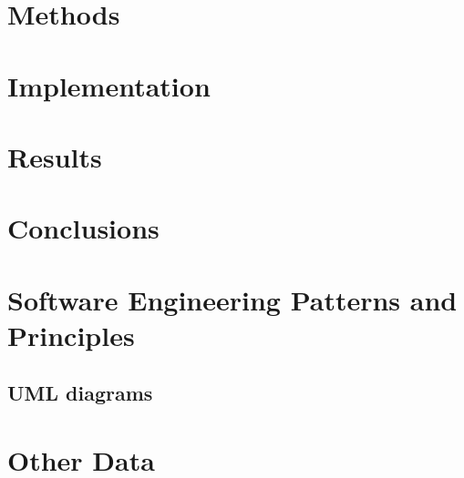 \documentclass{report}
\begin{document}


\chapter{Methods}

\chapter{Implementation}

\chapter{Results}


\chapter{Conclusions}




\begin{appendices}
\chapter{Software Engineering Patterns and Principles}
	\section{UML diagrams}
\chapter{Other Data}
	
\end{appendices}
\end{document}
